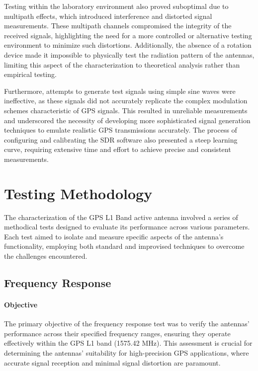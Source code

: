 \documentclass[12pt,letter]{article}
\begin{document}
Testing within the laboratory environment also proved suboptimal due to multipath effects, which introduced interference and distorted signal measurements. These multipath channels compromised the integrity of the received signals, highlighting the need for a more controlled or alternative testing environment to minimize such distortions. Additionally, the absence of a rotation device made it impossible to physically test the radiation pattern of the antennas, limiting this aspect of the characterization to theoretical analysis rather than empirical testing.

Furthermore, attempts to generate test signals using simple sine waves were ineffective, as these signals did not accurately replicate the complex modulation schemes characteristic of GPS signals. This resulted in unreliable measurements and underscored the necessity of developing more sophisticated signal generation techniques to emulate realistic GPS transmissions accurately. The process of configuring and calibrating the SDR software also presented a steep learning curve, requiring extensive time and effort to achieve precise and consistent measurements.



\newpage

\section*{Testing Methodology}

The characterization of the GPS L1 Band active antenna involved a series of methodical tests designed to evaluate its performance across various parameters. Each test aimed to isolate and measure specific aspects of the antenna's functionality, employing both standard and improvised techniques to overcome the challenges encountered.

\subsection*{Frequency Response}

\paragraph{Objective}
The primary objective of the frequency response test was to verify the antennas' performance across their specified frequency ranges, ensuring they operate effectively within the GPS L1 band (1575.42 MHz). This assessment is crucial for determining the antennas' suitability for high-precision GPS applications, where accurate signal reception and minimal signal distortion are paramount.
\end{document}
